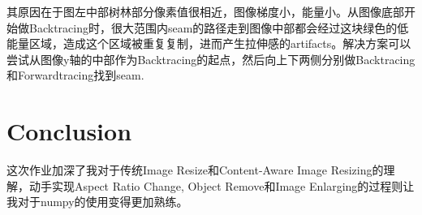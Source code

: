 \documentclass[UTF8]{ctexart}
\begin{document}
	其原因在于图左中部树林部分像素值很相近，图像梯度小，能量小。从图像底部开始做Backtracing时，很大范围内seam的路径走到图像中部都会经过这块绿色的低能量区域，造成这个区域被重复复制，进而产生拉伸感的artifacts。解决方案可以尝试从图像y轴的中部作为Backtracing的起点，然后向上下两侧分别做Backtracing和Forwardtracing找到seam.
	
	\section{Conclusion}
	这次作业加深了我对于传统Image Resize和Content-Aware Image Resizing的理解，动手实现Aspect Ratio Change, Object Remove和Image Enlarging的过程则让我对于numpy的使用变得更加熟练。
	
\end{document}

